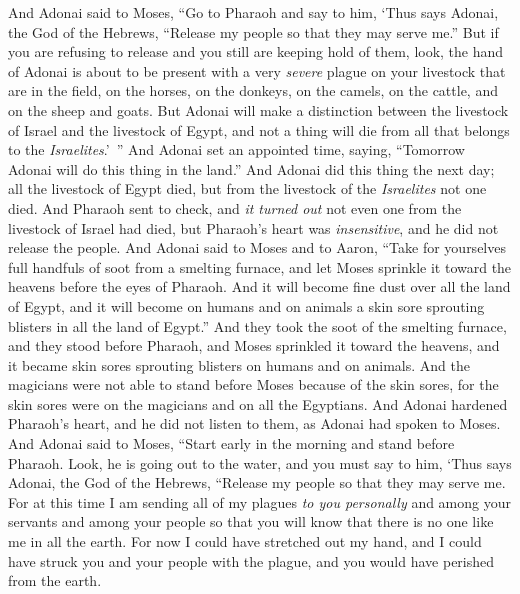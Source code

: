 \begin{biblechapter} %
 And Adonai said to Moses, “Go to Pharaoh and say to him, ‘Thus says Adonai, the God of the Hebrews, “Release my people so that they may serve me.”
\verse But if you are refusing to release and you still are keeping hold of them,
\verse look, the hand of Adonai is about to be present with a very \textit{severe} plague on your livestock that are in the field, on the horses, on the donkeys, on the camels, on the cattle, and on the sheep and goats.
\verse But Adonai will make a distinction between the livestock of Israel and the livestock of Egypt, and not a thing will die from all that belongs to the \textit{Israelites}.’ ”
\verse And Adonai set an appointed time, saying, “Tomorrow Adonai will do this thing in the land.”
\verse And Adonai did this thing the next day; all the livestock of Egypt died, but from the livestock of the \textit{Israelites} not one died.
\verse And Pharaoh sent to check, and \textit{it turned out} not even one from the livestock of Israel had died, but Pharaoh’s heart was \textit{insensitive}, and he did not release the people.
 And Adonai said to Moses and to Aaron, “Take for yourselves full handfuls of soot from a smelting furnace, and let Moses sprinkle it toward the heavens before the eyes of Pharaoh.
\verse And it will become fine dust over all the land of Egypt, and it will become on humans and on animals a skin sore sprouting blisters in all the land of Egypt.”
\verse And they took the soot of the smelting furnace, and they stood before Pharaoh, and Moses sprinkled it toward the heavens, and it became skin sores sprouting blisters on humans and on animals.
\verse And the magicians were not able to stand before Moses because of the skin sores, for the skin sores were on the magicians and on all the Egyptians.
\verse And Adonai hardened Pharaoh’s heart, and he did not listen to them, as Adonai had spoken to Moses.
 And Adonai said to Moses, “Start early in the morning and stand before Pharaoh. Look, he is going out to the water, and you must say to him, ‘Thus says Adonai, the God of the Hebrews, “Release my people so that they may serve me.
\verse For at this time I am sending all of my plagues \textit{to you personally} and among your servants and among your people so that you will know that there is no one like me in all the earth.
\verse For now I could have stretched out my hand, and I could have struck you and your people with the plague, and you would have perished from the earth.

\end{biblechapter}
